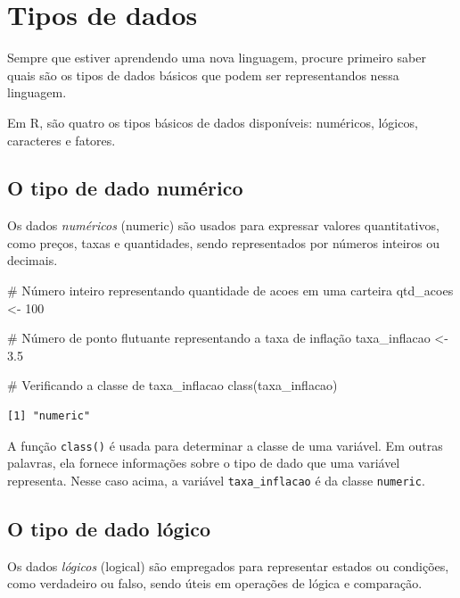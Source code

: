 \documentclass[
  portuguese,
  letterpaper,
  DIV=11,
  numbers=noendperiod]{scrreprt}
\newenvironment{Shaded}{\begin{snugshade}}{\end{snugshade}}
\newcommand{\CommentTok}[1]{\textcolor[rgb]{0.37,0.37,0.37}{#1}}
\newcommand{\DecValTok}[1]{\textcolor[rgb]{0.68,0.00,0.00}{#1}}
\newcommand{\FloatTok}[1]{\textcolor[rgb]{0.68,0.00,0.00}{#1}}
\newcommand{\FunctionTok}[1]{\textcolor[rgb]{0.28,0.35,0.67}{#1}}
\newcommand{\NormalTok}[1]{\textcolor[rgb]{0.00,0.23,0.31}{#1}}
\newcommand{\OtherTok}[1]{\textcolor[rgb]{0.00,0.23,0.31}{#1}}
\theoremstyle{definition}
\theoremstyle{remark}
\begin{document}
\section{Tipos de dados}\label{sec-tipodedados}

Sempre que estiver aprendendo uma nova linguagem, procure primeiro saber
quais são os tipos de dados básicos que podem ser representandos nessa
linguagem.

Em R, são quatro os tipos básicos de dados disponíveis: numéricos,
lógicos, caracteres e fatores.

\subsection{O tipo de dado numérico}\label{sec-tipodedados-num}

Os dados \emph{numéricos} (numeric) são usados para expressar valores
quantitativos, como preços, taxas e quantidades, sendo representados por
números inteiros ou decimais.

\begin{Shaded}
\begin{Highlighting}[]
\CommentTok{\# Número inteiro representando quantidade de acoes em uma carteira}
\NormalTok{qtd\_acoes }\OtherTok{\textless{}{-}} \DecValTok{100}

\CommentTok{\# Número de ponto flutuante representando a taxa de inflação}
\NormalTok{taxa\_inflacao }\OtherTok{\textless{}{-}} \FloatTok{3.5}

\CommentTok{\# Verificando a classe de taxa\_inflacao}
\FunctionTok{class}\NormalTok{(taxa\_inflacao)}
\end{Highlighting}
\end{Shaded}

\begin{verbatim}
[1] "numeric"
\end{verbatim}

A função \texttt{class()} é usada para determinar a classe de uma
variável. Em outras palavras, ela fornece informações sobre o tipo de
dado que uma variável representa. Nesse caso acima, a variável
\texttt{taxa\_inflacao} é da classe \texttt{numeric}.

\subsection{O tipo de dado lógico}\label{o-tipo-de-dado-luxf3gico}

Os dados \emph{lógicos} (logical) são empregados para representar
estados ou condições, como verdadeiro ou falso, sendo úteis em operações
de lógica e comparação.
\end{document}
